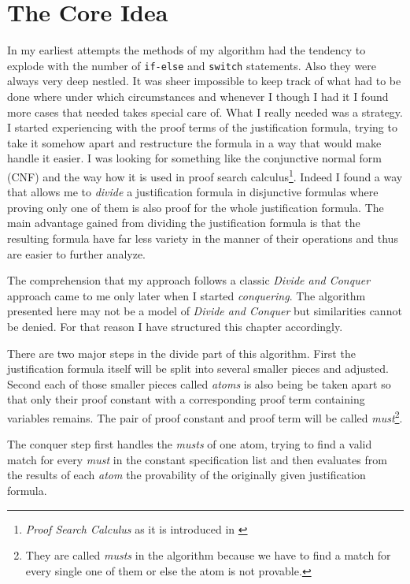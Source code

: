 \section{The Core Idea}
In my earliest attempts the methods of my algorithm had the tendency to explode with the number of \texttt{if-else} and \texttt{switch} statements. Also they were always very deep nestled. It was sheer impossible to keep track of what had to be done where under which circumstances and whenever I though I had it I found more cases that needed takes special care of. What I really needed was a strategy. I started experiencing with the proof terms of the justification formula, trying to take it somehow apart and restructure the formula in a way that would make handle it easier. I was looking for something like the conjunctive normal form (CNF) and the way how it is used in proof search calculus\footnote{\emph{Proof Search Calculus} as it is introduced in \cite{jaeg}}. Indeed I found a way that allows me to \emph{divide} a justification formula in disjunctive formulas where proving only one of them is also proof for the whole justification formula. The main advantage gained from dividing the justification formula is that the resulting formula have far less variety in the manner of their operations and thus are easier to further analyze.

The comprehension that my approach follows a classic \emph{Divide and Conquer} approach came to me only later when I started \emph{conquering}. The algorithm presented here may not be a model of \emph{Divide and Conquer} but similarities cannot be denied. For that reason I have structured this chapter accordingly.

\medskip

There are two major steps in the divide part of this algorithm. First the justification formula itself will be split into several smaller pieces and adjusted. Second each of those smaller pieces called \emph{atoms} is also being be taken apart so that only their proof constant with a corresponding proof term containing variables remains. The pair of proof constant and proof term will be called \emph{must}\footnote{They are called \emph{musts} in the algorithm because we have to find a match for every single one of them or else the atom is not provable.}.

The conquer step first handles the \emph{musts} of one atom, trying to find a valid match for every \emph{must} in the constant specification list and then evaluates from the results of each \emph{atom} the provability of the originally given justification formula.

